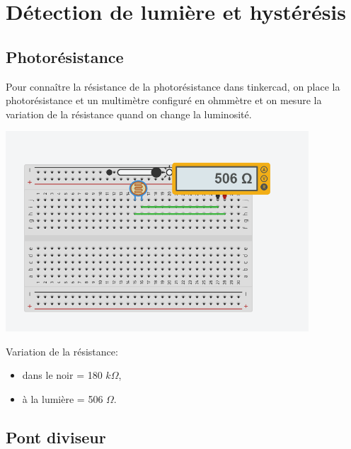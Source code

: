 \documentclass[a4paper]{article}
\begin{document}
\section{Détection de lumière et hystérésis}










\subsection{Photorésistance}





Pour connaître la résistance de la photorésistance dans tinkercad, on place la photorésistance et un multimètre configuré en ohmmètre et on mesure la variation de la résistance quand on change la luminosité.
\begin{center}
    \includegraphics[width=0.85\textwidth]{images/VoltmetreTinkerCAD.PNG}
\end{center}
Variation de la résistance:
\begin{itemize}
    \item dans le noir = 180 $ k\Omega $,
    \item à la lumière = 506 $ \Omega $.
\end{itemize}










\subsection{Pont diviseur}
\end{document}
